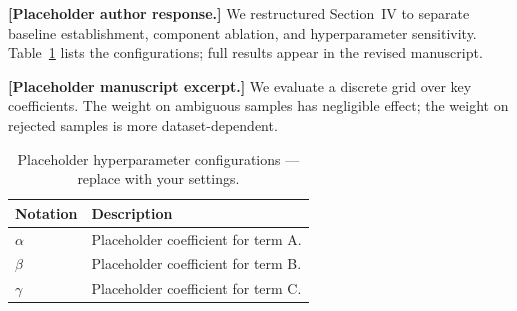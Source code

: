 \begin{refsegment}
\begin{authorresponse}
\textbf{[Placeholder author response.]} We restructured Section~IV to separate baseline establishment, component ablation, and hyperparameter sensitivity. Table~\ref{tab:hyperparams} lists the configurations; full results appear in the revised manuscript.
\end{authorresponse}

\begin{authorchange}

\textbf{[Placeholder manuscript excerpt.]} We evaluate a discrete grid over key coefficients. The weight on ambiguous samples has negligible effect; the weight on rejected samples is more dataset-dependent.

\begin{table}[7]
    \centering
    \caption{Placeholder hyperparameter configurations --- replace with your settings.}
    \begin{tabularx}{\linewidth}{|l|X|}
        \hline
        \textbf{Notation} & \textbf{Description} \\
        \hline
        $\alpha$ & Placeholder coefficient for term A. \\
        \hline
        $\beta$ & Placeholder coefficient for term B. \\
        \hline
        $\gamma$ & Placeholder coefficient for term C. \\
        \hline
    \end{tabularx}
    \label{tab:hyperparams}
\end{table}
\end{authorchange}
\RRSectionBibliography
\end{refsegment}
